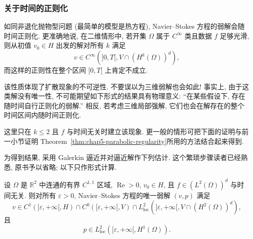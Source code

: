 \subsubsection{关于时间的正则化}
\label{subsec:chap5-time-regularization}

如同非退化抛物型问题 (最简单的模型是热方程), Navier--Stokes 方程的弱解会随时间正则化. 更准确地说, 在二维情形中, 若开集 $\Omega$ 属于 $C^\infty$ 类且数据 $f$ 足够光滑, 则从初值 $v_0\in H$ 出发的解对所有 $k$ 满足
\[
 v\in C^\infty(]0,T[,V\cap(H^k(\Omega))^d),
\]
而这样的正则性在整个区间 $[0,T[$ 上肯定不成立.

该性质体现了扩散现象的不可逆性. 不要误以为三维弱解也会如此! 事实上, 由于这类解没有唯一性, 不可能期望如下形式的结果具有物理意义: ``在某些假设下, 存在随时间自行正则化的弱解.'' 相反, 若考虑三维局部强解, 它们也会在解存在的整个时间区间内随时间正则化.

这里只在 $k\leq2$ 且 $f$ 与时间无关时建立该现象. 更一般的情形可把下面的证明与前一小节证明 Theorem~\ref{thm:chap5-parabolic-regularity}所用的方法结合起来得到.

为得到结果, 采用 Galerkin 逼近并对逼近解作下列估计. 这个繁琐步骤读者已经熟悉, 原书予以省略; 以下只作形式计算.

\begin{Theorem}
\label{thm:chap5-time-regularization}
设 $\Omega$ 是 $\mathbb R^2$ 中连通的有界 $C^{1,1}$ 区域, $\operatorname{Re}>0$, $v_0\in H$, 且 $f\in(L^2(\Omega))^d$ 与时间无关. 则对所有 $\varepsilon>0$, Navier--Stokes 方程的唯一弱解 $(v,p)$ 满足
\[
 v\in C^1([\varepsilon,+\infty[,H)
 \cap C^0([\varepsilon,+\infty[,V)
 \cap L_{\mathrm{loc}}^2(]\varepsilon,+\infty[,V\cap(H^2(\Omega))^d),
\]
且
\[
 p\in L_{\mathrm{loc}}^2([\varepsilon,+\infty[,H^1(\Omega)).
\]
\end{Theorem}

